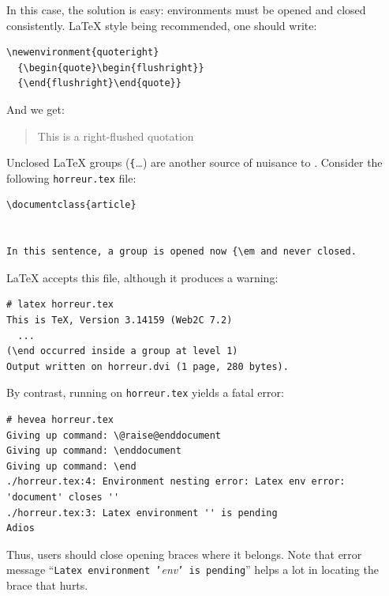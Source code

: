In this case, the solution is easy: environments must be opened and
closed consistently. \LaTeX{} style being recommended, one should write:
\begin{verbatim}
\newenvironment{quoteright}
  {\begin{quote}\begin{flushright}}
  {\end{flushright}\end{quote}}
\end{verbatim}
And we get:
\begin{htmlout}\newenvironment{quoteright}{\begin{quote}\begin{flushright}}{\end{flushright}\end{quote}}
\begin{htmlonly}
\begin{quoteright}
This is a right-flushed quotation
\end{quoteright}
\end{htmlonly}
\end{htmlout}


Unclosed \LaTeX{} groups (\verb+{+\ldots{}) are another source
of nuisance to \hevea{}.
Consider the following \texttt{horreur.tex} file:
\begin{verbatim}
\documentclass{article}


In this sentence, a group is opened now {\em and never closed.

\end{verbatim}
\LaTeX{} accepts this file, although it produces a warning:
\begin{verbatim}
# latex horreur.tex 
This is TeX, Version 3.14159 (Web2C 7.2)
  ...
(\end occurred inside a group at level 1)
Output written on horreur.dvi (1 page, 280 bytes).

\end{verbatim}

By contrast, running \hevea{} on \texttt{horreur.tex} yields a fatal error:
\begin{verbatim}
# hevea horreur.tex 
Giving up command: \@raise@enddocument
Giving up command: \enddocument
Giving up command: \end
./horreur.tex:4: Environment nesting error: Latex env error: 'document' closes ''
./horreur.tex:3: Latex environment '' is pending
Adios
\end{verbatim}
Thus, users should close opening braces where it belongs.
Note that \hevea{} error message ``\texttt{Latex environment
'}\textit{env}\texttt{' is pending}'' helps a lot in locating
the brace that hurts.

